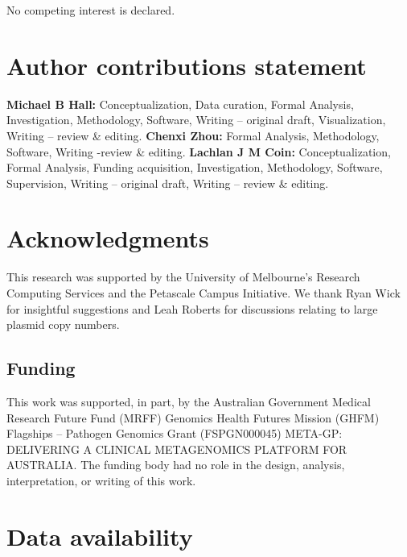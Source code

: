 \documentclass[unnumsec,webpdf,modern,large]{oup-authoring-template}
\theoremstyle{thmstyleone}%
\theoremstyle{thmstyletwo}%
\theoremstyle{thmstylethree}%
\begin{document}
No competing interest is declared.


\section{Author contributions statement}

\textbf{Michael B Hall:} Conceptualization, Data curation, Formal Analysis, Investigation, Methodology, Software, Writing – original draft, Visualization, Writing – review \& editing.
\textbf{Chenxi Zhou:} Formal Analysis, Methodology, Software, Writing -review \& editing.
\textbf{Lachlan J M Coin:} Conceptualization, Formal Analysis, Funding acquisition, Investigation, Methodology, Software, Supervision, Writing – original draft, Writing – review \& editing. 


\section{Acknowledgments}

This research was supported by the University of Melbourne’s Research Computing Services and the Petascale Campus Initiative. We thank Ryan Wick for insightful suggestions and Leah Roberts for discussions relating to large plasmid copy numbers.

\subsection{Funding}

This work was supported, in part, by the Australian Government Medical Research Future Fund (MRFF) Genomics Health Futures Mission (GHFM) Flagships – Pathogen Genomics Grant (FSPGN000045) META-GP: DELIVERING A CLINICAL METAGENOMICS PLATFORM FOR AUSTRALIA. The funding body had no role in the design, analysis, interpretation, or writing of this work. 

\section{Data availability}
\end{document}
